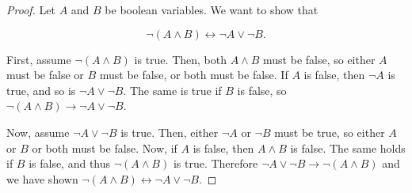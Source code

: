 \documentclass{article}
\begin{document}
\begin{proof}
Let $A$ and $B$ be boolean variables. We want to show that

\[ \neg (A \land B) \leftrightarrow \neg A \lor \neg B. \]

First, assume $\neg (A \land B)$ is true. Then, both $A \land B$ must be false, so either $A$ must be false or $B$ must be false, or both must be false. If $A$ is false, then $\neg A$ is true, and so is $\neg A \lor \neg B.$ The same is true if $B$ is false, so $\neg (A \land B) \rightarrow \neg A \lor \neg B.$

Now, assume $\neg A \lor \neg B$ is true. Then, either $\neg A$ or $\neg B$ must be true, so either $A$ or $B$ or both must be false. Now, if $A$ is false, then $A \land B$ is false. The same holds if $B$ is false, and thus $\neg (A \land B)$ is true. Therefore $\neg A \lor \neg B \rightarrow \neg (A \land B)$ and we have shown $ \neg (A \land B) \leftrightarrow \neg A \lor \neg B. $
\end{proof}
\end{document}
